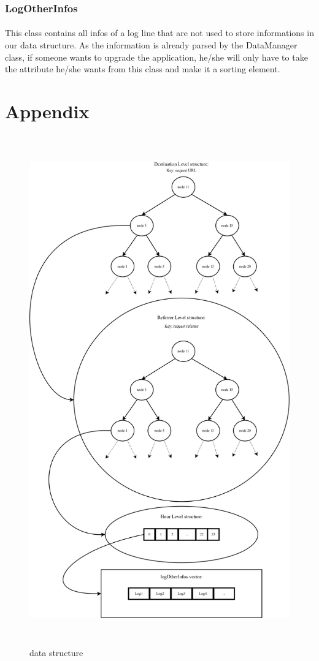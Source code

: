 \documentclass[a4paper, 12pts]{article}
\begin{document}
\subsubsection{LogOtherInfos}
\paragraph{}
This class contains all infos of a log line that are not used to store informations in our data structure. As the information is already parsed by the DataManager class, if someone wants to upgrade the application, he/she will only have to take the attribute he/she wants from this class and make it a sorting element.

\section{Appendix}

\begin{figure}[t]
	\caption{data structure}
	\includegraphics[height=22cm]{../diagrammes/dataStruct/dataStruct.png}
\end{figure}
\end{document}
